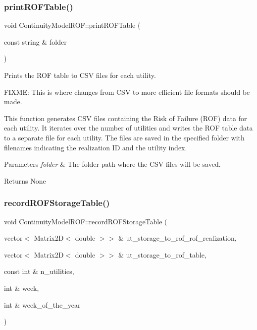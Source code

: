 \subsubsection{\texorpdfstring{print\+R\+O\+F\+Table()}{printROFTable()}}
{\footnotesize\ttfamily void Continuity\+Model\+R\+O\+F\+::print\+R\+O\+F\+Table (\begin{DoxyParamCaption}\item[{const string \&}]{folder }\end{DoxyParamCaption})}



Prints the R\+OF table to C\+SV files for each utility. 

F\+I\+X\+ME\+: This is where changes from C\+SV to more efficient file formats should be made.

This function generates C\+SV files containing the Risk of Failure (R\+OF) data for each utility. It iterates over the number of utilities and writes the R\+OF table data to a separate file for each utility. The files are saved in the specified folder with filenames indicating the realization ID and the utility index.


\begin{DoxyParams}{Parameters}
{\em folder} & The folder path where the C\+SV files will be saved.\\
\hline
\end{DoxyParams}
\begin{DoxyReturn}{Returns}
None 
\end{DoxyReturn}
\mbox{\label{classContinuityModelROF_aa2348a2a5dea751462771ef538243e75}} 
\subsubsection{\texorpdfstring{record\+R\+O\+F\+Storage\+Table()}{recordROFStorageTable()}}
{\footnotesize\ttfamily void Continuity\+Model\+R\+O\+F\+::record\+R\+O\+F\+Storage\+Table (\begin{DoxyParamCaption}\item[{vector$<$ Matrix2D$<$ double $>$$>$ \&}]{ut\+\_\+storage\+\_\+to\+\_\+rof\+\_\+rof\+\_\+realization,  }\item[{vector$<$ Matrix2D$<$ double $>$$>$ \&}]{ut\+\_\+storage\+\_\+to\+\_\+rof\+\_\+table,  }\item[{const int \&}]{n\+\_\+utilities,  }\item[{int \&}]{week,  }\item[{int \&}]{week\+\_\+of\+\_\+the\+\_\+year }\end{DoxyParamCaption})}



